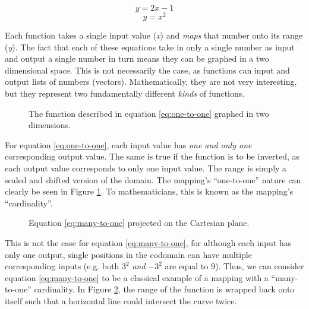 \begin{equation} y = 2x - 1 \label{eq:one-to-one} \end{equation} 
\begin{equation} y = x^2  \label{eq:many-to-one}  \end{equation}

Each function takes a single input value (\emph{x}) and \emph{maps} that number onto its range (\emph{y}). The fact that each of these equations take in only a single number as input and output a single number in turn means they can be graphed in a two dimensional space. This is not necessarily the case, as functions can input and output lists of numbers (vectors). Mathematically, they are not very interesting, but they represent two fundamentally different \emph{kinds} of functions.

\begin{figure}[h]
	\centering
\caption{The function described in equation \ref{eq:one-to-one} graphed in two dimensions.}
\label{fig:one-to-one_graph}
\end{figure}

For equation \ref{eq:one-to-one}, each input value has \emph{one and only one} corresponding output value. The same is true if the function is to be inverted, as each output value corresponds to only one input value. The range is simply a scaled and shifted version of the domain. The mapping's ``one-to-one'' nature can clearly be seen in Figure \ref{fig:one-to-one_graph}. To mathematicians, this is known as the mapping's ``cardinality''.

\begin{figure}[h]
	\centering
\caption{Equation \ref{eq:many-to-one} projected on the Cartesian plane.}
\label{fig:many-to-one_graph}
\end{figure}

This is not the case for equation \ref{eq:many-to-one}, for although each input has only one output, single positions in the codomain can have multiple corresponding inputs (e.g. both $3^2$ \emph{and} $-3^2$ are equal to 9). Thus, we can consider equation \ref{eq:many-to-one} to be a classical example of a mapping with a ``many-to-one'' cardinality. In Figure \ref{fig:many-to-one_graph}, the range of the function is wrapped back onto itself such that a horizontal line could intersect the curve twice.

